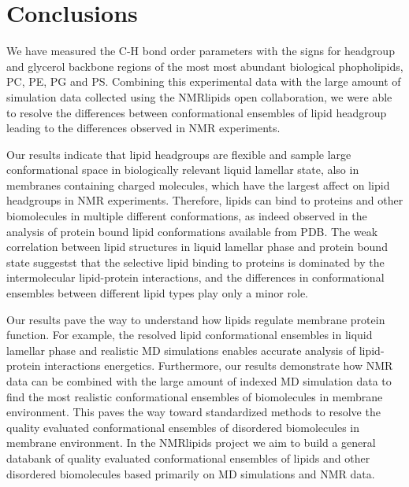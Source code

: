 \documentclass[aps,prl,superscriptaddress,twocolumn]{revtex4}
\begin{document}
\section{Conclusions}

We have measured the C-H bond order parameters with the signs for headgroup and glycerol
backbone regions of the most most abundant biological phopholipids, PC, PE, PG and PS.
Combining this experimental data with the large amount of simulation data collected 
using the NMRlipids open collaboration, we were able to resolve the differences between
conformational ensembles of lipid headgroup leading to the differences observed in NMR experiments.

Our results indicate that lipid headgroups are flexible and sample large conformational space
in biologically relevant liquid lamellar state, also in membranes containing charged molecules,
which have the largest affect on lipid headgroups in NMR experiments.
Therefore, lipids can bind to proteins and other biomolecules in multiple different conformations,
as indeed observed in the analysis of protein bound lipid conformations available from PDB.
The weak correlation between lipid structures in liquid lamellar phase and protein bound state
suggestst that the selective lipid binding to proteins is dominated by the intermolecular lipid-protein
interactions, and the differences in conformational ensembles between different lipid types
play only a minor role.

Our results pave the way to understand how lipids regulate membrane protein function.
For example, the resolved lipid conformational ensembles in liquid lamellar phase and
realistic MD simulations enables accurate analysis of lipid-protein interactions energetics.
Furthermore, our results demonstrate how NMR data can be combined with the large amount of
indexed MD simulation data to find the most realistic conformational ensembles of biomolecules
in membrane environment. This paves the way toward standardized methods to resolve the quality
evaluated conformational ensembles of disordered biomolecules in membrane environment.
In the NMRlipids project we aim to build a general databank of quality evaluated
conformational ensembles of lipids and other disordered biomolecules based primarily on
MD simulations and NMR data.



%
\end{document}

